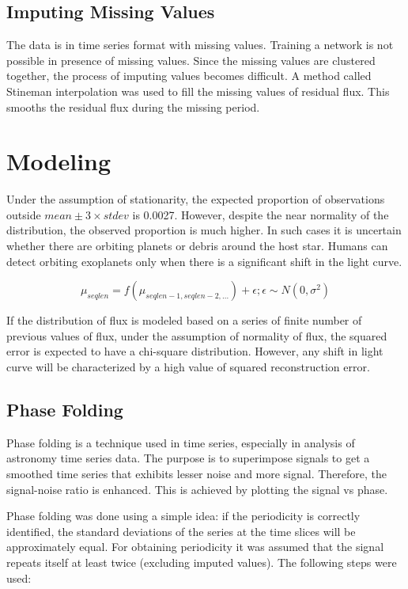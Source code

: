 \documentclass[%
aip,
amsmath,amssymb,
reprint,%
]{revtex4-1}
\begin{document}
\subsection{Imputing Missing Values}

The data is in time series format with missing values. Training a network is not possible in presence of missing values. Since the missing values are clustered together, the process of imputing values becomes difficult. A method called Stineman interpolation was used to fill the missing values of residual flux. This smooths the residual flux during the missing period.

\section{Modeling}

Under the assumption of stationarity, the expected proportion of observations outside $mean \pm 3 \times stdev$ is 0.0027. However, despite the near normality of the distribution, the observed proportion is much higher. In such cases it is uncertain whether there are orbiting planets or debris around the host star. Humans can detect orbiting exoplanets only when there is a significant shift in the light curve.

$$\mu_{seqlen} = f(\mu_{seqlen-1,seqlen-2, ...}) + \epsilon; \epsilon \sim N(0, \sigma^2)$$

If the distribution of flux is modeled based on a series of finite number of previous values of flux, under the assumption of normality of flux, the squared error is expected to have a chi-square distribution. However, any shift in light curve will be characterized by a high value of squared reconstruction error.

\subsection{Phase Folding}

Phase folding is a technique used in time series, especially in analysis of astronomy time series data. The purpose is to superimpose signals to get a smoothed time series that exhibits lesser noise and more signal. Therefore, the signal-noise ratio is enhanced. This is achieved by plotting the signal vs phase.

Phase folding was done using a simple idea: if the periodicity is correctly identified, the standard deviations of the series at the time slices will be approximately equal. For obtaining periodicity it was assumed that the signal repeats itself at least twice (excluding imputed values). The following steps were used:
\end{document}
